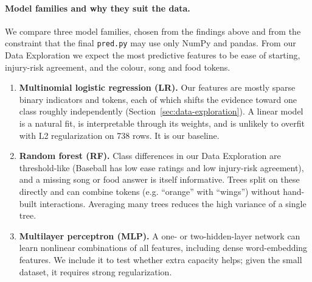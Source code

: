 \documentclass[11pt,titlepage]{article}
\begin{document}
\paragraph{Model families and why they suit the data.}
We compare three model families, chosen from the findings above and from the
constraint that the final \texttt{pred.py} may use only NumPy and pandas. From our Data Exploration we expect the most predictive features to be ease of starting, injury-risk agreement, and the colour, song and food tokens.
\begin{enumerate}\itemsep0pt
\item \textbf{Multinomial logistic regression (LR).} Our features are mostly sparse
binary indicators and tokens, each of which shifts the evidence toward one class
roughly independently (Section~\ref{sec:data-exploration}). A linear model is a
natural fit, is interpretable through its weights, and is unlikely to overfit with
L2 regularization on 738 rows. It is our baseline.
\item \textbf{Random forest (RF).} Class differences in our Data Exploration are threshold-like (Baseball has low ease ratings and low injury-risk agreement), and a missing song or food answer is itself informative. Trees split on these directly and can combine tokens (e.g. “orange” with “wings”) without hand-built interactions. Averaging many trees reduces the high variance of a single tree.
\item \textbf{Multilayer perceptron (MLP).} A one- or two-hidden-layer network can
learn nonlinear combinations of all features, including dense word-embedding
features. We include it to test whether extra capacity helps; given the small
dataset, it requires strong regularization.
\end{enumerate}
\end{document}
